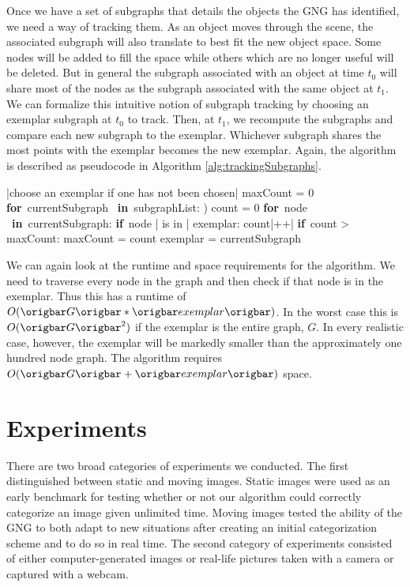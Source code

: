 \documentclass{article}
\renewcommand{\|}{\origbar} %
\renewcommand{\FOR}{\mbox{{\bf for} }\tab}
\renewcommand{\IF}{\mbox{{\bf if} }\tab}
\newcommand{\IN}{\mbox{ {\bf in} }}
\begin{document}
Once we have a set of subgraphs that details the objects the GNG has identified, we need a way of tracking them. As an object moves through the scene, the associated subgraph will also translate to best fit the new object space. Some nodes will be added to fill the space while others which are no longer useful will be deleted. But in general the subgraph associated with an object at time $t_0$ will share most of the nodes as the subgraph associated with the same object at $t_1$. We can formalize this intuitive notion of subgraph tracking by choosing an exemplar subgraph at $t_0$ to track. Then, at $t_1$, we recompute the subgraphs and compare each new subgraph to the exemplar. Whichever subgraph shares the most points with the exemplar becomes the new exemplar. Again, the algorithm is described as pseudocode in Algorithm \ref{alg:trackingSubgraphs}.

\begin{Algorithm}[h!]
\begin{program}
  |choose an exemplar if one has not been chosen|
  maxCount = 0
  \FOR currentSubgraph \IN subgraphList: )
    count = 0
    \FOR node \IN currentSubgraph:
      \IF node | is in | exemplar:
        count|++| \untab \untab
    \IF count > maxCount:
      maxCount = count
      exemplar = currentSubgraph
\end{program}
\caption{Pseudocode for Tracking Subgraphs}
\label{alg:trackingSubgraphs}
\end{Algorithm}

We can again look at the runtime and space requirements for the algorithm. We need to traverse every node in the graph and then check if that node is in the exemplar. Thus this has a runtime of $O(\|G\|*\|exemplar\|)$. In the worst case this is $O(\|G\|^2)$ if the exemplar is the entire graph, $G$. In every realistic case, however, the exemplar will be markedly smaller than the approximately one hundred node graph. The algorithm requires $O(\|G\|+\|exemplar\|)$ space.

\section{Experiments}
\label{sec:experiments}


There are two broad categories of experiments we conducted. The first distinguished between static and moving images. Static images were used as an early benchmark for testing whether or not our algorithm could correctly categorize an image given unlimited time. Moving images tested the ability of the GNG to both adapt to new situations after creating an initial categorization scheme and to do so in real time. The second category of experiments consisted of either computer-generated images or real-life pictures taken with a camera or captured with a webcam. 
\end{document}
